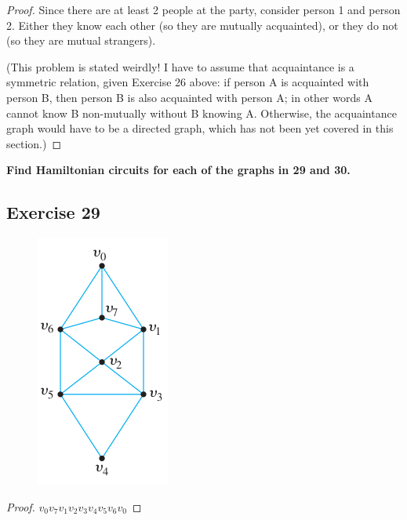 \documentclass[14pt]{extarticle}
\newcommand{\cy}{\color{cyan}}
\begin{document}
\begin{proof}
Since there are at least 2 people at the party, consider person 1 and person 2. Either they know each other (so they 
are mutually acquainted), or they do not (so they are mutual strangers).

(This problem is stated weirdly! I have to assume that acquaintance is a symmetric relation, given Exercise 26 above: 
if person A is acquainted with person B, then person B is also acquainted with person A; in other words A cannot know B 
non-mutually without B knowing A. Otherwise, the acquaintance graph would have to be a directed graph, which has not been 
yet covered in this section.)
\end{proof}

{\bf \cy Find Hamiltonian circuits for each of the graphs in 29 and 30.}

\subsection{Exercise 29}
\begin{figure}[ht!]
\centering
\includegraphics[scale=0.5]{../images/10.1.29.png}
\end{figure}

\begin{proof}
\(v_0 v_7 v_1 v_2 v_3 v_4 v_5 v_6 v_0\)
\end{proof}
\end{document}
